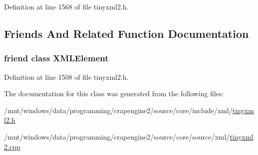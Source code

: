 Definition at line 1568 of file tinyxml2.\+h.



\subsection{Friends And Related Function Documentation}
\hypertarget{classtinyxml2_1_1_x_m_l_document_ac2fba9b6e452829dd892f7392c24e0eb}{}
\subsubsection[{X\+M\+L\+Element}]{\setlength{\rightskip}{0pt plus 5cm}friend class {\bf X\+M\+L\+Element}\hspace{0.3cm}{\ttfamily [friend]}}\label{classtinyxml2_1_1_x_m_l_document_ac2fba9b6e452829dd892f7392c24e0eb}


Definition at line 1508 of file tinyxml2.\+h.



The documentation for this class was generated from the following files\+:\begin{DoxyCompactItemize}
\item 
/mnt/windows/data/programming/crapengine2/source/core/include/xml/\hyperlink{tinyxml2_8h}{tinyxml2.\+h}\item 
/mnt/windows/data/programming/crapengine2/source/core/source/xml/\hyperlink{tinyxml2_8cpp}{tinyxml2.\+cpp}\end{DoxyCompactItemize}
